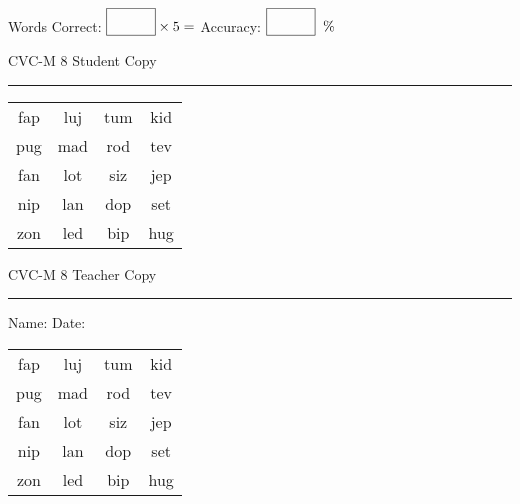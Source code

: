 \documentclass{memoir}
\begin{document}
\small

Words Correct: $\fbox{\phantom{\huge 100}} \times 5 = $ Accuracy: $\fbox{\phantom{\huge 100}}\;\; \%$ 

\vfill

\newpage


\footnotesize \noindent
CVC-M 8 \hfill Student Copy
\smallskip
\hrule

\Large

\setlength{\tabcolsep}{14pt}
\def\arraystretch{2}

{\selectfont


\begin{vplace}[0.5]
\begin{center}
\begin{tabular}{cccc}
fap & luj & tum & kid \\
pug & mad & rod & tev \\
fan & lot & siz & jep \\
nip & lan & dop & set \\
zon & led & bip & hug \\
\end{tabular}
\end{center}
\end{vplace}

}

\newpage

\footnotesize \noindent
CVC-M 8 \hfill Teacher Copy
\smallskip
\hrule

\small

\vfill

\noindent
Name: \underline{\hspace{1.75in}} \hfill Date: \underline{\hspace{1in}}

\Large

{\selectfont


\begin{vplace}[0.5]
\begin{center}
\begin{tabular}{cccc}
fap & luj & tum & kid \\
pug & mad & rod & tev \\
fan & lot & siz & jep \\
nip & lan & dop & set \\
zon & led & bip & hug \\
\end{tabular}
\end{center}
\end{vplace}



}
\end{document}
